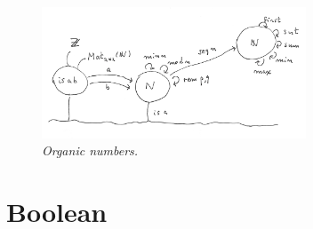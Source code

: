 \documentclass[11pt]{article}
\begin{document}
\begin{figure}[h]
\centering
\includegraphics[width=0.7\textwidth]{organics.png}
\caption{{\it Organic numbers.}}
\end{figure}


\section{Boolean} 
\end{document}
